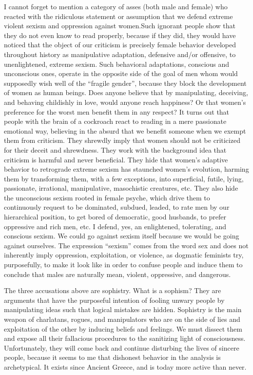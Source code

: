 \par I cannot forget to mention a category of asses (both male and female) who reacted with the ridiculous statement or assumption that we defend extreme violent sexism and oppression against women.\footnotemark[12] Such ignorant people show that they do not even know to read properly, because if they did, they would have noticed that the object of our criticism is precisely female behavior developed throughout history as manipulative adaptation, defensive and/or offensive, to unenlightened, extreme sexism. Such behavioral adaptations, conscious and unconscious ones, operate in the opposite side of the goal of men whom would supposedly wish well of the \enquote{fragile gender}, because they block the development of women as human beings. Does anyone believe that by manipulating, deceiving, and behaving childishly in love, would anyone reach happiness? Or that women's preference for the worst men benefit them in any respect? It turns out that people with the brain of a cockroach react to reading in a mere passionate emotional way, believing in the absurd that we benefit someone when we exempt them from criticism. They shrewdly imply that women should not be criticized for their deceit and shrewdness. They work with the background idea that criticism is harmful and never beneficial. They hide that women's adaptive behavior to retrograde extreme sexism has staunched women's evolution, harming them by transforming them, with a few exceptions, into superficial, futile, lying, passionate, irrational, manipulative, masochistic creatures, etc. They also hide the unconscious sexism rooted in female psyche, which drive them to continuously request to be dominated, subdued, leaded, to rate men by our hierarchical position, to get bored of democratic, good husbands, to prefer oppressive and rich men, etc. I defend, yes, an enlightened, tolerating, and conscious sexism. We could go against sexism itself because we would be going against ourselves. The expression \enquote{sexism} comes from the word sex and does not inherently imply oppression, exploitation, or violence, as dogmatic feminists try, purposefully, to make it look like in order to confuse people and induce them to conclude that males are naturally mean, violent, oppressive, and dangerous.

\footnotetext[12]{}

\par The three accusations above are sophistry. What is a sophism? They are arguments that have the purposeful intention of fooling unwary people by manipulating ideas such that logical mistakes are hidden. Sophistry is the main weapon of charlatans, rogues, and manipulators who are on the side of lies and exploitation of the other by inducing beliefs and feelings. We must dissect them and expose all their fallacious procedures to the sanitizing light of consciousness. Unfortunately, they will come back and continue disturbing the lives of sincere people, because it seems to me that dishonest behavior in the analysis is archetypical. It exists since Ancient Greece, and is today more active than never.